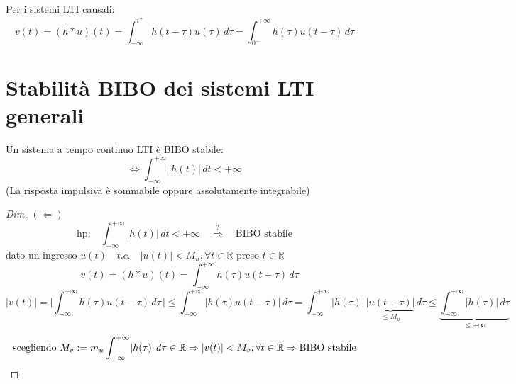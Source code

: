 Per i sistemi LTI causali:
\[
	v(t)=(h*u)(t) = \int_{-\infty}^{t^+}h(t-\tau)u(\tau)\,d\tau = \int_{0^-}^{+\infty}h(\tau)u(t-\tau)\,d\tau
\]


\section{Stabilità BIBO dei sistemi LTI generali}
\label{sec:BIBO}




Un sistema a tempo continuo LTI è BIBO stabile:
\[
	\Leftrightarrow \int_{-\infty}^{+\infty}\lvert h(t) \rvert \,dt < +\infty
\]
(La risposta impulsiva è sommabile oppure assolutamente integrabile)

\begin{proof}[Dim]
	\emph{$(\Leftarrow)$}
	\[
		\text{hp:} \quad \int_{-\infty}^{+\infty}\lvert h(t) \rvert \,dt < +\infty \quad \overset{?}{\Rightarrow} \quad \text{BIBO stabile}
	\]	
	dato un ingresso $u(t) \quad t.c.\quad \lvert u(t) \rvert < M_u , \forall t \in \mathbb{R}$ preso $t \in \mathbb{R}$ 
	\[
		\quad v(t)=(h*u)(t) = \int_{-\infty}^{+\infty}h(\tau)u(t-\tau)\,d\tau 
	\]
	\[
		\lvert v(t) \rvert 
		= \bigg\lvert \int_{-\infty}^{+\infty}h(\tau)u(t-\tau)\,d\tau \,  \bigg\rvert
		\le \int_{-\infty}^{+\infty} \rvert h(\tau)u(t-\tau) \lvert\,d\tau
		= \int_{-\infty}^{+\infty} \rvert h(\tau) \lvert \, \underbrace{\rvert u(t-\tau) \lvert}_{\le M_u} \,d\tau
		\le \underbrace{\int_{-\infty}^{+\infty} \rvert h(\tau)\lvert\,d\tau}_{\le + \infty}
	\]
	\[
		\text{scegliendo } M_v := m_u \int_{-\infty}^{+\infty} \rvert h(\tau)\lvert\,d\tau \in \mathbb{R} \Rightarrow \lvert v(t) \rvert < M_v, \forall t \in \mathbb{R}\Rightarrow \text{BIBO stabile} \qedhere
	\]
\end{proof}

